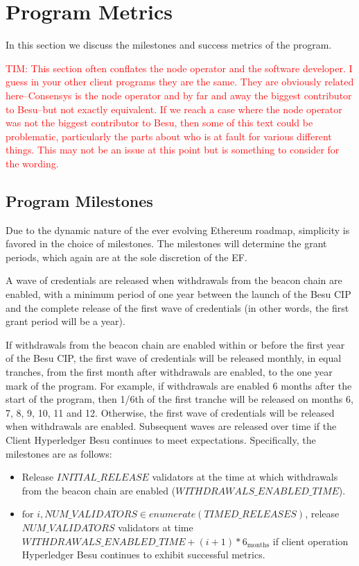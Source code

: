 
\section{Program Metrics} \label{sec:metrics}
In this section we discuss the milestones and success metrics of the program.

\textcolor{red}{TIM: This section often conflates the node operator and the software developer.  I guess in your other client programs they are the same.  They are obviously related here--Consensys is the node operator and by far and away the biggest contributor to Besu--but not exactly equivalent.  If we reach a case where the node operator was not the biggest contributor to Besu, then some of this text could be problematic, particularly the parts about who is at fault for various different things.  This may not be an issue at this point but is something to consider for the wording.}

\subsection{Program Milestones}
Due to the dynamic nature of the ever evolving Ethereum roadmap, simplicity is favored in the choice of milestones.  The milestones will determine the grant periods, which again are at the sole discretion of the EF.

A wave of credentials are released when withdrawals from the beacon chain are enabled, with a minimum period of one year between the launch of the Besu CIP and the complete release of the first wave of credentials (in other words, the first grant period will be a year).

If withdrawals from the beacon chain are enabled within or before the first year of the Besu CIP, the first wave of credentials will be released monthly, in equal tranches, from the first month after withdrawals are enabled, to the one year mark of the program. For example, if withdrawals are enabled 6 months after the start of the program, then 1/6th of the first tranche will be released on months 6, 7, 8, 9, 10, 11 and 12. Otherwise, the first wave of credentials will be released when withdrawals are enabled. Subsequent waves are released over time if the Client Hyperledger Besu continues to meet expectations. Specifically, the milestones are as follows:

\begin{itemize}
\item Release $INITIAL\_RELEASE$ validators at the time at which withdrawals from the beacon chain are enabled ($WITHDRAWALS\_ENABLED\_TIME$).
\item $\text{for } i, NUM\_VALIDATORS \in enumerate \left(TIMED\_RELEASES \right)$, release $NUM\_VALIDATORS$ validators at time $WITHDRAWALS\_ENABLED\_TIME + (i + 1) * 6_{\text{months}}$ if client operation Hyperledger Besu continues to exhibit successful metrics.
\end{itemize}

